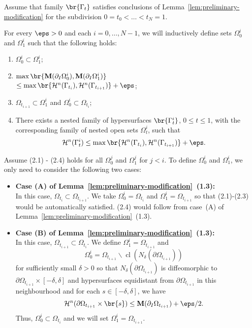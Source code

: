 Assume that family $\br{\Gamma_t}$ satisfies conclusions of Lemma~\ref{lem:preliminary-modification} for the subdivision $0 = t_0 < \dots < t_N = 1$.

For every $\eps > 0$ and each $i = 0, \dots, N - 1$, we will inductively define sets $\Omega_0^i$ and $\Omega_1^i$ such that the following holds:
\begin{enumerate}
    \item[(2.1)] $\Omega_0^i \subset \Omega_1^i$;
    \item[(2.2)] $\max\br{\mathbf{M}(\partial_I\Omega_0^i), \mathbf{M}(\partial_I\Omega_1^i)}$ \\
    $\leq \max\br{\mathcal{H}^n(\Gamma_{t_i}), \mathcal{H}^n(\Gamma_{t_{i + 1}})} + \eps$;
    \item[(2.3)] $\Omega_{t_{i + 1}} \subset \Omega_1^i$ and $\Omega_0^i \subset \Omega_{t_i}$;
    \item[(2.4)] There exists a nested family of hypersurfaces $\br{\Gamma_t^i}$, $0 \leq t \leq 1$, with the corresponding family of nested open sets $\Omega_t^i$, such that
    \begin{equation*}
        \mathcal{H}^n(\Gamma_t^i) \leq \max\br{\mathcal{H}^n(\Gamma_{t_i}), \mathcal{H}^n(\Gamma_{t_{i+1}})} + \eps.
    \end{equation*}
\end{enumerate}
Assume (2.1) - (2.4) holds for all $\Omega_0^j$ and $\Omega_1^j$ for $j < i$. To define $\Omega_0^i$ and $\Omega_1^i$, we only need to consider the following two cases:
\begin{itemize}
    \item \textbf{Case (A) of Lemma~\ref{lem:preliminary-modification}~(1.3):}\\
    In this case, $\Omega_{t_i} \subset \Omega_{t_{i + 1}}$. We take $\Omega_0^i = \Omega_{t_i}$ and $\Omega_1^i = \Omega_{t_{i + 1}}$ so that (2.1)-(2.3) would be automatically satisfied. (2.4) would follow from case~(A) of Lemma~\ref{lem:preliminary-modification}~(1.3).
    \item \textbf{Case (B) of Lemma~\ref{lem:preliminary-modification}~(1.3):}\\
    In this case, $\Omega_{t_{i + 1}} \subset \Omega_{t_i}$. We define $\Omega_1^i = \Omega_{t_{i + 1}}$ and
    \begin{equation*}
        \Omega_0^i = \Omega_{t_{i + 1}}\backslash \operatorname{cl}(N_\delta(\partial\Omega_{t_{i + 1}}))
    \end{equation*}
    for sufficiently small $\delta > 0$ so that $N_\delta(\partial\Omega_{t_{i + 1}})$ is diffeomorphic to $\partial\Omega_{t_{i + 1}} \times [-\delta, \delta]$ and hypersurfaces equidistant from $\partial\Omega_{t_{i + 1}}$ in this neighbourhood and for each $s \in [-\delta, \delta]$, we have
    \begin{equation*}
        \mathcal{H}^n(\partial\Omega_{t_{i + 1}}\times \br{s}) \leq \mathbf{M}(\partial_I\Omega_{t_{i + 1}}) + \eps/2.
    \end{equation*}
    Thus, $\Omega_0^i \subset \Omega_{t_i}$ and we will set $\Omega_1^i = \Omega_{t_{i + 1}}$.
\end{itemize}
